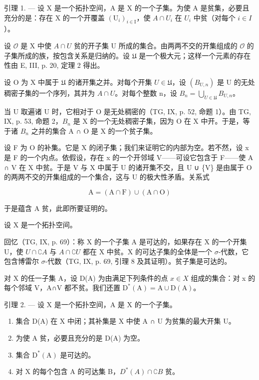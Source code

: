 引理 1. --- 设 X 是一个拓扑空间，A 是 X 的一个子集。为使 A 是贫集，必要且充分的是：存在 X 的一个开覆盖 \((\mathrm{U}_{i})_{i\in\mathrm{I}}\)，使 \(A\cap U_{i}\) 在 \(U_{i}\) 中贫（对每个 \(i\in I\)）。

设 \(\mathcal{O}\) 是 X 中使 \(A \cap U\) 贫的开子集 U 所成的集合。由两两不交的开集组成的 \(\mathcal{O}\) 的子集所成的族，按包含关系是归纳的。设 \(\mathfrak{U}\) 是一个极大元；这样一个元素的存在性由 E, III, p. 20, 定理 2 得出。

设 O 为 X 中属于 \(\mathfrak{U}\) 的诸开集之并。对每个开集 \(U \in \mathfrak{U}\)，设 \((B_{U,n})\) 是 U 的无处稠密子集的一个序列，其并为 \(A \cap U\)。对每个整数 n，设 \(B_n = \bigcup_{U \in \mathfrak{U}} B_{U,n}\)。

当 U 取遍诸 U 时，它相对于 O 是无处稠密的（TG, IX, p. 52, 命题 1）。由 TG, IX, p. 53, 命题 2，\(B_{n}\) 是 X 的一个无处稠密子集，因为 O 在 X 中开。于是，等于诸 \(B_{n}\) 之并的集合 A ∩ O 是 X 的一个贫子集。

设 F 为 O 的补集。它是 X 的闭子集；我们来证明它的内部为空。若不然，设 x 是 F 的一个内点。依假设，存在 x 的一个开邻域 V——可设它包含于 F——使 A ∩ V 在 X 中贫。于是 V 与 X 中属于 U 的诸开集不交，且 U ∪ \{V\} 是由属于 O 的两两不交的开集组成的一个集合，这与 U 的极大性矛盾。关系式

\[
\mathrm{A} = (\mathrm{A} \cap \mathrm{F}) \cup (\mathrm{A} \cap \mathrm{O})
\]

于是蕴含 A 贫，此即所要证明的。

设 X 是一个拓扑空间。

回忆（TG, IX, p. 69）：称 X 的一个子集 A 是可达的，如果存在 X 的一个开集 U，使 \(U \cap \complement A\) 与 \(A \cap \complement U\) 都在 X 中贫。X 的可达子集的全体是一个 \(\sigma\)-代数，它包含博雷尔 \(\sigma\)-代数（TG, IX, p. 69, 引理 8 及其证明）。贫子集是可达的。

对 X 的任一子集 A，设 D(A) 为由满足下列条件的点 \(x \in X\) 组成的集合：对 x 的每个邻域 V，A∩V 都不贫。我们还置 \(\mathrm{D}^{*}(\mathrm{A}) = \mathrm{A} \cup \mathrm{D}(\mathrm{A})\)。

引理 2. --- 设 X 是一个拓扑空间，A 是 X 的一个子集。

\begin{enumerate}
\def\labelenumi{\alph{enumi})}
\item
  集合 D(A) 在 X 中闭；其补集是 X 中使 A ∩ U 为贫集的最大开集 U。
\item
  为使 A 贫，必要且充分的是 D(A) 为空。
\item
  集合 \(\mathrm{D}^{*}(\mathrm{A})\) 是可达的。
\item
  对 X 的每个包含 A 的可达集 B，\(D^{*}(A) \cap \complement B\) 贫。
\end{enumerate}

